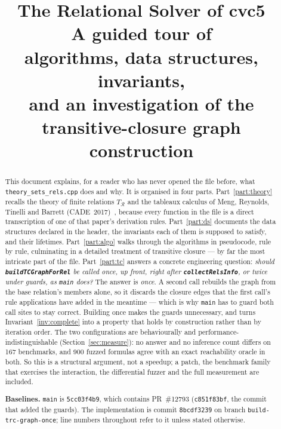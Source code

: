 \documentclass[11pt,a4paper]{article}
\title{\bfseries The Relational Solver of cvc5\\[4pt]
       \large A guided tour of
       \file{src/theory/sets/theory\_sets\_rels.\{h,cpp\}}\\[8pt]
       \normalsize algorithms, data structures, invariants,\\
       \normalsize and an investigation of the transitive-closure graph
       construction}
\author{}
\date{}
\newcommand{\code}[1]{\texttt{\small #1}}
\newcommand{\fn}[1]{\texttt{\small\bfseries #1}}
\newcommand{\file}[1]{\texttt{\small #1}}
\newcommand{\TR}{T_{\mathcal{R}}}
\theoremstyle{definition}
\begin{document}
\maketitle
\vspace{-2.2\baselineskip}

\begin{abstract}
\noindent
This document explains, for a reader who has never opened the file before, what
\file{theory\_sets\_rels.cpp} does and why. It is organised in four parts.
Part~\ref{part:theory} recalls the theory of finite relations $\TR$ and the
tableaux calculus of Meng, Reynolds, Tinelli and Barrett
(CADE~2017)~\cite{MRT17}, because every function in the file is a direct
transcription of one of that paper's derivation rules.
Part~\ref{part:ds} documents the data structures declared in the header, the
invariants each of them is supposed to satisfy, and their lifetimes.
Part~\ref{part:algo} walks through the algorithms in pseudocode, rule by rule,
culminating in a detailed treatment of transitive closure --- by far the most
intricate part of the file.
Part~\ref{part:tc} answers a concrete engineering question:
\emph{should \fn{buildTCGraphForRel} be called once, up front, right after
\fn{collectRelsInfo}, or twice under guards, as \code{main} does?}
The answer is \emph{once}. A second call rebuilds the graph from the base
relation's members alone, so it discards the closure edges that the first call's
rule applications have added in the meantime --- which is why \code{main} has to
guard both call sites to stay correct. Building once makes the guards
unnecessary, and turns Invariant~\ref{inv:complete} into a property that holds by
construction rather than by iteration order. The two configurations are
behaviourally and performance-indistinguishable
(Section~\ref{sec:measure}): no answer and no inference count differs on 167
benchmarks, and 900 fuzzed formulas agree with an exact reachability oracle in
both. So this is a structural argument, not a speedup; a patch, the benchmark
family that exercises the interaction, the differential fuzzer and the full
measurement are included.

\medskip\noindent
\textbf{Baselines.} \code{main} is \code{5cc03f4b9}, which contains
PR~\#12793 (\code{c851f83bf}, the commit that added the guards). The
implementation is commit \code{8bcdf3239} on branch
\code{build-trc-graph-once}; line numbers throughout refer to it unless stated
otherwise.
\end{abstract}

\tableofcontents
\newpage
\end{document}
